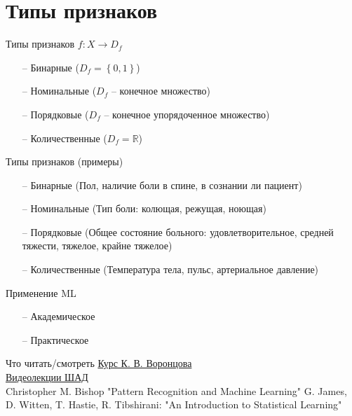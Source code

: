 \documentclass[10pt]{beamer}
\begin{document}
{{\section{Типы признаков}

\begin{frame}{Типы признаков}
	${f: X \rightarrow D_f}$
	\begin{itemize} [<+->]
	  \item[--] Бинарные (${D_f = \left\{ 0, 1 \right\} }$)
	  \item[--] Номинальные (${D_f}$ -- конечное множество)
	  \item[--] Порядковые (${D_f}$ -- конечное упорядоченное множество)
	  \item[--] Количественные (${D_f = \mathbb{R} }$)
	\end{itemize}
\end{frame}

\begin{frame}{Типы признаков (примеры)}
	\begin{itemize} [<+->]
	  \item[--] Бинарные (Пол, наличие боли в спине, в сознании ли пациент)
	  \item[--] Номинальные (Тип боли: колющая, режущая, ноющая)
	  \item[--] Порядковые (Общее состояние больного: удовлетворительное, средней тяжести, тяжелое, крайне тяжелое)
	  \item[--] Количественные (Температура тела, пульс, артериальное давление)
	\end{itemize}
\end{frame}

\begin{frame}{Применение ML}
	\begin{itemize} [<+->]
	  \item[--] Академическое
	  \item[--] Практическое
	\end{itemize}
\end{frame}

\begin{frame}{Что читать/смотреть}
  \href{http://www.machinelearning.ru/wiki/images/6/6d/Voron-ML-1.pdf}{Курс К. В. Воронцова}\\
	\href{https://yandexdataschool.ru/edu-process/courses/machine-learning}{Видеолекции ШАД}\\
	Christopher M. Bishop "Pattern Recognition and Machine Learning"
	G. James, D. Witten, T. Hastie, R. Tibshirani: "An Introduction to Statistical Learning" 	
\end{frame}

}}
\end{document}
